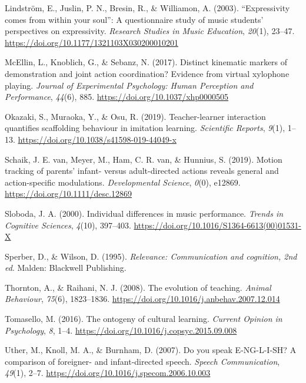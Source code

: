 \documentclass[
  english,
  man,floatsintext]{apa6}
\newlength{\cslhangindent}
\newenvironment{cslreferences}%
  {\setlength{\parindent}{0pt}%
  \everypar{\setlength{\hangindent}{\cslhangindent}}\ignorespaces}%
  {\par}
\begin{document}
\begin{cslreferences}
\leavevmode\hypertarget{ref-lindstrom_2003}{}%
Lindström, E., Juslin, P. N., Bresin, R., \& Williamon, A. (2003). ``Expressivity comes from within your soul'': A questionnaire study of music students' perspectives on expressivity. \emph{Research Studies in Music Education}, \emph{20}(1), 23--47. \url{https://doi.org/10.1177/1321103X030200010201}

\leavevmode\hypertarget{ref-mcellin_2017}{}%
McEllin, L., Knoblich, G., \& Sebanz, N. (2017). Distinct kinematic markers of demonstration and joint action coordination? Evidence from virtual xylophone playing. \emph{Journal of Experimental Psychology: Human Perception and Performance}, \emph{44}(6), 885. \url{https://doi.org/10.1037/xhp0000505}

\leavevmode\hypertarget{ref-okazaki_2019}{}%
Okazaki, S., Muraoka, Y., \& Osu, R. (2019). Teacher-learner interaction quantifies scaffolding behaviour in imitation learning. \emph{Scientific Reports}, \emph{9}(1), 1--13. \url{https://doi.org/10.1038/s41598-019-44049-x}

\leavevmode\hypertarget{ref-schaik_2019}{}%
Schaik, J. E. van, Meyer, M., Ham, C. R. van, \& Hunnius, S. (2019). Motion tracking of parents' infant- versus adult-directed actions reveals general and action-specific modulations. \emph{Developmental Science}, \emph{0}(0), e12869. \url{https://doi.org/10.1111/desc.12869}

\leavevmode\hypertarget{ref-sloboda_2000}{}%
Sloboda, J. A. (2000). Individual differences in music performance. \emph{Trends in Cognitive Sciences}, \emph{4}(10), 397--403. \url{https://doi.org/10.1016/S1364-6613(00)01531-X}

\leavevmode\hypertarget{ref-sperber_1995}{}%
Sperber, D., \& Wilson, D. (1995). \emph{Relevance: Communication and cognition, 2nd ed}. Malden: Blackwell Publishing.

\leavevmode\hypertarget{ref-thornton_2008}{}%
Thornton, A., \& Raihani, N. J. (2008). The evolution of teaching. \emph{Animal Behaviour}, \emph{75}(6), 1823--1836. \url{https://doi.org/10.1016/j.anbehav.2007.12.014}

\leavevmode\hypertarget{ref-tomasello_2016}{}%
Tomasello, M. (2016). The ontogeny of cultural learning. \emph{Current Opinion in Psychology}, \emph{8}, 1--4. \url{https://doi.org/10.1016/j.copsyc.2015.09.008}

\leavevmode\hypertarget{ref-uther_2007}{}%
Uther, M., Knoll, M. A., \& Burnham, D. (2007). Do you speak E-NG-L-I-SH? A comparison of foreigner- and infant-directed speech. \emph{Speech Communication}, \emph{49}(1), 2--7. \url{https://doi.org/10.1016/j.specom.2006.10.003}
\end{cslreferences}
\end{document}
